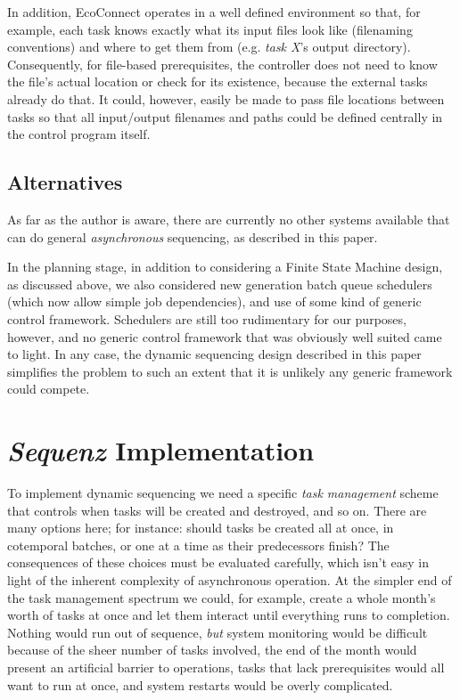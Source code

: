 \documentclass[11pt,a4paper]{article}
\begin{document}
In addition, EcoConnect operates in a well defined environment so that,
for example, each task knows exactly what its input files look like
(filenaming conventions) and where to get them from (e.g. {\em task X}'s
output directory). Consequently, for file-based prerequisites, the
controller does not need to know the file's actual location or check for
its existence, because the external tasks already do that. It could,
however, easily be made to pass file locations between tasks so that all
input/output filenames and paths could be defined centrally in the
control program itself.  


\subsection{Alternatives}

As far as the author is aware, there are currently no other systems
available that can do general {\em asynchronous} sequencing, as
described in this paper.

In the planning stage, in addition to considering a Finite State Machine
design, as discussed above, we also considered new generation batch
queue schedulers (which now allow simple job dependencies), and use of
some kind of generic control framework.  Schedulers are still too
rudimentary for our purposes, however, and no generic control framework
that was obviously well suited came to light. In any case, the dynamic
sequencing design described in this paper simplifies the problem to such
an extent that it is unlikely any generic framework could compete.  


\section{{\em Sequenz} Implementation}

To implement dynamic sequencing we need a specific {\em task management}
scheme that controls when tasks will be created and destroyed, and so
on. There are many options here; for instance: should tasks be created
all at once, in cotemporal batches, or one at a time as their
predecessors finish? The consequences of these choices must be evaluated
carefully, which isn't easy in light of the inherent complexity of
asynchronous operation. At the simpler end of the task management
spectrum we could, for example, create a whole month's worth of tasks at
once and let them interact until everything runs to completion.  Nothing
would run out of sequence, {\em but} system monitoring would be
difficult because of the sheer number of tasks involved, the end of the
month would present an artificial barrier to operations, tasks that lack
prerequisites would all want to run at once, and system restarts would
be overly complicated. 
\end{document}
